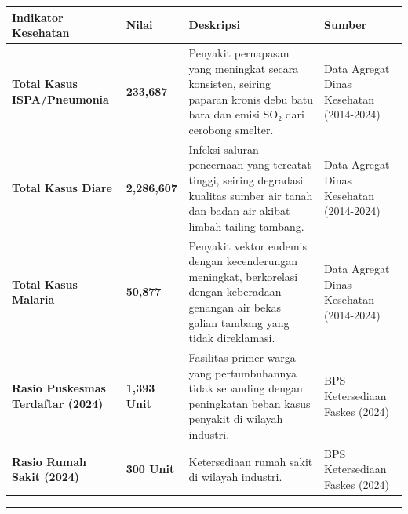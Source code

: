 \documentclass[
]{article}
\newcounter{none} %
\begin{document}
{\def\LTcaptype{none} %
\begin{longtable}[]{@{}
  >{\raggedright\arraybackslash}p{}
  >{\raggedright\arraybackslash}p{}
  >{\raggedright\arraybackslash}p{}
  >{\raggedright\arraybackslash}p{}@{}}
\toprule\noalign{}
\begin{minipage}[b]{\linewidth}\raggedright
Indikator Kesehatan
\end{minipage} & \begin{minipage}[b]{\linewidth}\raggedright
Nilai
\end{minipage} & \begin{minipage}[b]{\linewidth}\raggedright
Deskripsi
\end{minipage} & \begin{minipage}[b]{\linewidth}\raggedright
Sumber
\end{minipage} \\
\midrule\noalign{}
\endhead
\bottomrule\noalign{}
\endlastfoot
\textbf{Total Kasus ISPA/Pneumonia} & \textbf{233,687} & Penyakit
pernapasan yang meningkat secara konsisten, seiring paparan kronis debu
batu bara dan emisi SO₂ dari cerobong smelter. & Data Agregat Dinas
Kesehatan (2014-2024) \\
\textbf{Total Kasus Diare} & \textbf{2,286,607} & Infeksi saluran
pencernaan yang tercatat tinggi, seiring degradasi kualitas sumber air
tanah dan badan air akibat limbah tailing tambang. & Data Agregat Dinas
Kesehatan (2014-2024) \\
\textbf{Total Kasus Malaria} & \textbf{50,877} & Penyakit vektor endemis
dengan kecenderungan meningkat, berkorelasi dengan keberadaan genangan
air bekas galian tambang yang tidak direklamasi. & Data Agregat Dinas
Kesehatan (2014-2024) \\
\textbf{Rasio Puskesmas Terdaftar (2024)} & \textbf{1,393 Unit} &
Fasilitas primer warga yang pertumbuhannya tidak sebanding dengan
peningkatan beban kasus penyakit di wilayah industri. & BPS Ketersediaan
Faskes (2024) \\
\textbf{Rasio Rumah Sakit (2024)} & \textbf{300 Unit} & Ketersediaan
rumah sakit di wilayah industri. & BPS Ketersediaan Faskes (2024) \\
\end{longtable}
}

\begin{center}\rule{0.5\linewidth}{0.5pt}\end{center}
\end{document}
